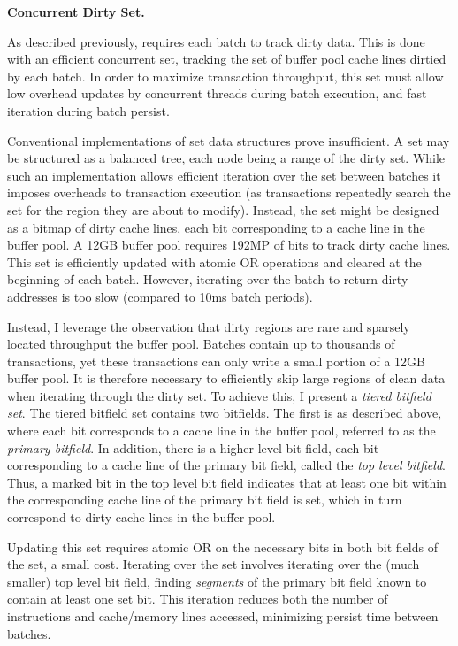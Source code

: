 \textbf{Concurrent Dirty Set.}

As described previously, \GroupCommit requires each batch to track dirty data.
This is done with an efficient concurrent set, tracking the set of buffer pool cache lines dirtied by each batch.
In order to maximize transaction throughput, this set must allow low overhead updates by concurrent threads during batch execution, and fast iteration during batch persist.

Conventional implementations of set data structures prove insufficient.
A set may be structured as a balanced tree, each node being a range of the dirty set.
While such an implementation allows efficient iteration over the set between batches it imposes overheads to transaction execution (as transactions repeatedly search the set for the region they are about to modify).
Instead, the set might be designed as a bitmap of dirty cache lines, each bit corresponding to a cache line in the buffer pool.
A 12GB buffer pool requires 192MP of bits to track dirty cache lines.
This set is efficiently updated with atomic OR operations and cleared at the beginning of each batch.
However, iterating over the batch to return dirty addresses is too slow (compared to 10ms batch periods).

Instead, I leverage the observation that dirty regions are rare and sparsely located throughput the buffer pool.
Batches contain up to thousands of transactions, yet these transactions can only write a small portion of a 12GB buffer pool.
It is therefore necessary to efficiently skip large regions of clean data when iterating through the dirty set.
To achieve this, I present a \emph{tiered bitfield set}.
The tiered bitfield set contains two bitfields.
The first is as described above, where each bit corresponds to a cache line in the buffer pool, referred to as the \emph{primary bitfield}.
In addition, there is a higher level bit field, each bit corresponding to a cache line of the primary bit field, called the \emph{top level bitfield}.
Thus, a marked bit in the top level bit field indicates that at least one bit within the corresponding cache line of the primary bit field is set, which in turn correspond to dirty cache lines in the buffer pool.

Updating this set requires atomic OR on the necessary bits in both bit fields of the set, a small cost.
Iterating over the set involves iterating over the (much smaller) top level bit field, finding \emph{segments} of the primary bit field known to contain at least one set bit.
This iteration reduces both the number of instructions and cache/memory lines accessed, minimizing persist time between batches.

